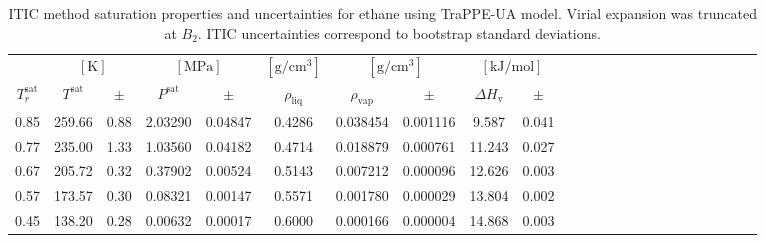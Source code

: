 \documentclass[5p,times]{elsarticle}
\begin{document}
\begin{table}[]
\centering
\caption{ITIC method saturation properties and uncertainties for ethane using TraPPE-UA model. Virial expansion was truncated at $B_2$. ITIC uncertainties correspond to bootstrap standard deviations.}
\label{tab:EXAMPLE-SIM/TraPPE-C2}
\begin{tabular}{cccccccccccccccccccccccc}
 & \multicolumn{2}{c}{$[\mathrm{K}]$} &	 \multicolumn{2}{c}{$[\mathrm{MPa}]$} & $[\mathrm{g/cm^3}]$ & \multicolumn{2}{c}{$[\mathrm{g/cm^3}]$} & \multicolumn{2}{c}{$[\mathrm{kJ/mol}]$} \\
$T_r^{\mathrm{sat}}$ & $T^{\mathrm{sat}}$ & $\pm$ & $P^{\mathrm{sat}}$ & $\pm$ & $\rho_{\mathrm{liq}}$ & $\rho_{\mathrm{vap}}$ & $\pm$ & $\Delta H_{\mathrm{v}}$ & $\pm$
 \\
\hline		
0.85	&	259.66	&	0.88	&	2.03290	&	0.04847		&	0.4286	&	0.038454	&	0.001116	&	9.587	&	0.041	\\
0.77	&	235.00	&	1.33	&	1.03560	&	0.04182		&	0.4714	&	0.018879	&	0.000761	&	11.243	&	0.027	\\
0.67	&	205.72	&	0.32	&	0.37902	&	0.00524		&	0.5143	&	0.007212	&	0.000096	&	12.626	&	0.003	\\
0.57	&	173.57	&	0.30	&	0.08321	&	0.00147		&	0.5571	&	0.001780	&	0.000029	&	13.804	&	0.002	\\
0.45	&	138.20	&	0.28	&	0.00632	&	0.00017		&	0.6000	&	0.000166	&	0.000004	&	14.868	&	0.003	\\
\end{tabular}

\end{table}
\end{document}
